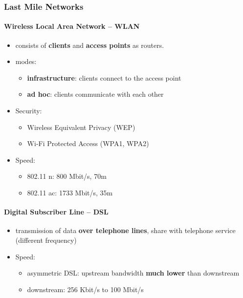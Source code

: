 \subsubsection{Last Mile Networks}

\paragraph{Wireless Local Area Network -- WLAN}
\begin{itemize}
	\item consists of \textbf{clients} and \textbf{access points} as routers.
	\item modes:
	\begin{itemize}
		\item \textbf{infrastructure}: clients connect to the access point
		\item \textbf{ad hoc}: clients communicate with each other
	\end{itemize}
	\item Security:
	\begin{itemize}
		\item Wireless Equivalent Privacy (WEP)
		\item Wi-Fi Protected Access (WPA1, WPA2) 
	\end{itemize}
	\item Speed:
	\begin{itemize}
		\item 802.11 n: 800 Mbit/s, 70m
		\item 802.11 ac: 1733 Mbit/s, 35m
	\end{itemize}
\end{itemize}

\paragraph{Digital Subscriber Line -- DSL}
\begin{itemize}
	\item transmission of data \textbf{over telephone lines}, share with telephone service (different frequency)
	\item Speed:
	\begin{itemize}
		\item asymmetric DSL: upstream bandwidth \textbf{much lower} than downstream
		\item downstream: 256 Kbit/s to 100 Mbit/s
	\end{itemize}
	
\end{itemize}

